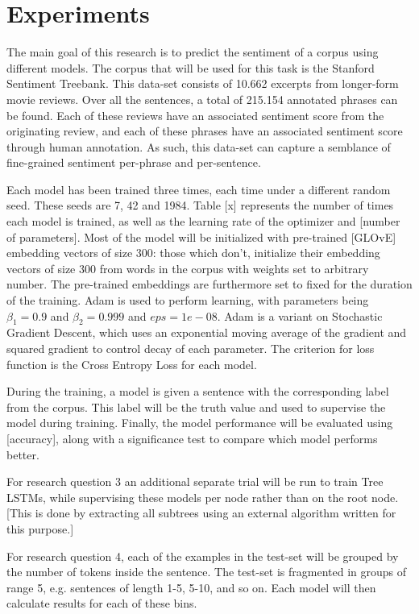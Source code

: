 \section{Experiments}
\label{sec: experiments}
The main goal of this research is to predict the sentiment of a corpus using
different models. The corpus that will be used for this task is the Stanford
Sentiment Treebank\cite{socher2013recursive}. This data-set consists of 10.662
excerpts from longer-form movie reviews. Over all the sentences, a total of
215.154 annotated phrases can be found. Each of these reviews have an associated
sentiment score from the originating review, and each of these phrases have an
associated sentiment score through human annotation. As such, this data-set can 
capture a semblance of fine-grained sentiment per-phrase and per-sentence.

Each model has been trained three times, each time under a different random
seed. These seeds are 7, 42 and 1984. Table [x] represents the number of times
each model is trained, as well as the learning rate of the optimizer and [number
of parameters]. Most of the model will be initialized with pre-trained [GLOvE]
embedding vectors of size 300: those which don't, initialize their embedding
vectors of size 300 from words in the corpus with weights set to arbitrary
number. The pre-trained embeddings are furthermore set to fixed for the duration
of the training. Adam\cite{DBLP:journals/corr/KingmaB14} is used to perform
learning, with parameters being $\beta_{1}=0.9$ and $\beta_{2}=0.999$ and
$eps=1e-08$. Adam is a variant on Stochastic Gradient Descent, which uses an
exponential moving average of the gradient and squared gradient to control decay
of each parameter. The criterion for loss function is the Cross Entropy Loss for
each model.

During the training, a model is given a sentence with the corresponding label
from the corpus. This label will be the truth value and used to supervise the
model during training. Finally, the model performance will be evaluated using [accuracy],
along with a significance test to compare which model performs better.

For research question 3 an additional separate trial will be run to train Tree
LSTMs, while supervising these models per node rather than on the root node.
[This is done by extracting all subtrees using an external algorithm written for
this purpose.]

For research question 4, each of the examples in the test-set will be grouped by
the number of tokens inside the sentence. The test-set is fragmented in groups
of range 5, e.g. sentences of length 1-5, 5-10, and so on. Each model will then
calculate results for each of these bins.

